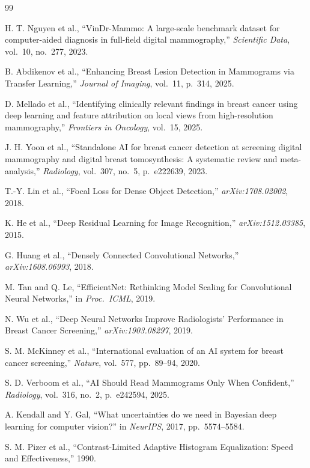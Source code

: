 \documentclass[conference]{IEEEtran}
\newcommand{\vindr}{VinDr-Mammo}
\begin{document}
\begin{thebibliography}{99}

 H. T. Nguyen et al., ``\vindr{}: A large-scale benchmark dataset for computer-aided diagnosis in full-field digital mammography,'' \emph{Scientific Data}, vol.~10, no.~277, 2023.

 B. Abdikenov et al., ``Enhancing Breast Lesion Detection in Mammograms via Transfer Learning,'' \emph{Journal of Imaging}, vol.~11, p.~314, 2025.

 D. Mellado et al., ``Identifying clinically relevant findings in breast cancer using deep learning and feature attribution on local views from high-resolution mammography,'' \emph{Frontiers in Oncology}, vol.~15, 2025.

 J. H. Yoon et al., ``Standalone AI for breast cancer detection at screening digital mammography and digital breast tomosynthesis: A systematic review and meta-analysis,'' \emph{Radiology}, vol.~307, no.~5, p.~e222639, 2023.

 T.-Y. Lin et al., ``Focal Loss for Dense Object Detection,'' \emph{arXiv:1708.02002}, 2018.

 K. He et al., ``Deep Residual Learning for Image Recognition,'' \emph{arXiv:1512.03385}, 2015.

 G. Huang et al., ``Densely Connected Convolutional Networks,'' \emph{arXiv:1608.06993}, 2018.

 M. Tan and Q. Le, ``EfficientNet: Rethinking Model Scaling for Convolutional Neural Networks,'' in \emph{Proc.\ ICML}, 2019.

 N. Wu et al., ``Deep Neural Networks Improve Radiologists' Performance in Breast Cancer Screening,'' \emph{arXiv:1903.08297}, 2019.

 S. M. McKinney et al., ``International evaluation of an AI system for breast cancer screening,'' \emph{Nature}, vol.~577, pp.~89--94, 2020.

 S. D. Verboom et al., ``AI Should Read Mammograms Only When Confident,'' \emph{Radiology}, vol.~316, no.~2, p.~e242594, 2025.

 A. Kendall and Y. Gal, ``What uncertainties do we need in Bayesian deep learning for computer vision?'' in \emph{NeurIPS}, 2017, pp.~5574--5584.

 S. M. Pizer et al., ``Contrast-Limited Adaptive Histogram Equalization: Speed and Effectiveness,'' 1990.


\end{thebibliography}
\end{document}
